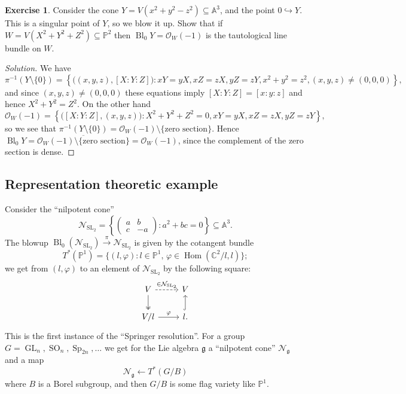 \documentclass{article}
\theoremstyle{definition}
\newtheorem*{exercise}{Exercise}
\DeclareMathOperator{\Hom}{Hom}
\DeclareMathOperator{\Sp}{Sp}
\DeclareMathOperator{\SO}{SO}
\DeclareMathOperator{\SL}{SL}
\DeclareMathOperator{\GL}{GL}
\DeclareMathOperator{\Bl}{Bl}
\newcommand{\closure}[1]{\overline{#1}}
\newcommand{\g}{\mathfrak{g}}
\newcommand{\calN}{\mathcal{N}}
\renewcommand{\O}{\mathcal{O}}
\renewcommand{\P}{\mathbb{P}}
\newcommand{\A}{\mathbb{A}}
\newcommand{\C}{\mathbb{C}}
\begin{document}
\begin{exercise}
    Consider the cone $Y=V(x^2+y^2-z^2)\subseteq\A^3$, and the point
    $0\hookrightarrow Y$. This is a singular point of $Y$, so we blow it up.
    Show that if $W=V(X^2+Y^2+Z^2)\subseteq\P^2$ then $\Bl_0Y=\O_W(-1)$ is the
    tautological line bundle on $W$.
\end{exercise}

\begin{proof}[Solution]
    We have
    \begin{equation*}
        \pi^{-1}(Y\setminus\{0\})
        = \left\{\bigl((x,y,z),[X:Y:Z]\bigr)
            :xY=yX,xZ=zX,yZ=zY,x^2+y^2=z^2,(x,y,z)\ne(0,0,0)\right\},
    \end{equation*}
    and since $(x,y,z)\ne(0,0,0)$ these equations imply $[X:Y:Z]=[x:y:z]$ and
    hence $X^2+Y^2=Z^2$. On the other hand
    \begin{equation*}
        \O_W(-1) = \left\{\bigl([X:Y:Z],(x,y,z)\bigr)
            :X^2+Y^2+Z^2=0,xY=yX,xZ=zX,yZ=zY\right\},
    \end{equation*}
    so we see that
    $\pi^{-1}(Y\setminus\{0\})=\O_W(-1)\setminus\{\text{zero section}\}$. Hence
    $\Bl_0Y=\closure{\O_W(-1)\setminus\{\text{zero section}\}}=\O_W(-1)$, since
    the complement of the zero section is dense.
\end{proof}

\subsection*{Representation theoretic example}

Consider the ``nilpotent cone''
\begin{equation*}
    \calN_{\SL_2} = \left\{\begin{pmatrix}
            a & b \\ c & -a
    \end{pmatrix}:a^2+bc=0\right\} \subseteq\A^3.
\end{equation*}
The blowup $\Bl_0(\calN_{\SL_2})\xrightarrow\pi\calN_{\SL_2}$ is given by the
cotangent bundle
\begin{equation*}
    T^*(\P^1) = \{(l,\varphi):\text{$l\in\P^1$, $\varphi\in\Hom(\C^2/l,l)$}\};
\end{equation*}
we get from $(l,\varphi)$ to an element of $\calN_{\SL_2}$ by the following
square:
\begin{equation*}
    \begin{tikzcd}
        &V \ar[d,two heads] \ar[r,dashed,"\in\calN_{\SL_2}"] &V \\
        &V/l \ar[r,"\varphi"] &l. \ar[u,hook]
    \end{tikzcd}
\end{equation*}
This is the first instance of the ``Springer resolution''. For a group
$G=\GL_n,\SO_n,\Sp_{2n},\ldots$ we get for the Lie algebra $\g$ a ``nilpotent
cone'' $\calN_{\g}$ and a map
\begin{equation*}
    \calN_\g \leftarrow T^*(G/B)
\end{equation*}
where $B$ is a Borel subgroup, and then $G/B$ is some flag variety like $\P^1$.
\end{document}

